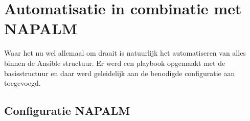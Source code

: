 
\chapter{Automatisatie in combinatie met NAPALM}
\label{ch:napalm}
Waar het nu wel allemaal om draait is natuurlijk het automatiseren van alles binnen de Ansible structuur. Er werd een playbook opgemaakt met de basisstructuur en daar werd geleidelijk aan de benodigde configuratie aan toegevoegd.

\section{Configuratie NAPALM}
\label{ch:napalmconfiguratie}
